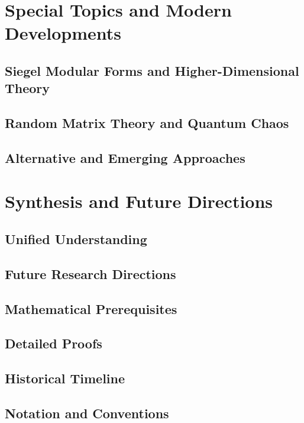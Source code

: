 \documentclass[12pt,a4paper,twoside]{book}
\theoremstyle{plain}
\theoremstyle{definition}
\theoremstyle{remark}
\begin{document}
\part{Special Topics and Modern Developments}

\chapter{Siegel Modular Forms and Higher-Dimensional Theory}
\label{ch:siegel}


\chapter{Random Matrix Theory and Quantum Chaos}
\label{ch:random_matrix}


\chapter{Alternative and Emerging Approaches}
\label{ch:alternative}


\part{Synthesis and Future Directions}

\chapter{Unified Understanding}
\label{ch:unified}


\chapter{Future Research Directions}
\label{ch:future}


\appendix

\chapter{Mathematical Prerequisites}
\label{app:prerequisites}


\chapter{Detailed Proofs}
\label{app:proofs}


\chapter{Historical Timeline}
\label{app:timeline}


\chapter{Notation and Conventions}
\label{app:notation}


\backmatter

\printbibliography[heading=bibintoc,title={Bibliography}]

\printindex
\end{document}
